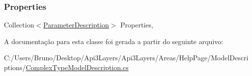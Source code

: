\subsubsection{\texorpdfstring{Properties}{Properties}}
{\footnotesize\ttfamily Collection$<$\hyperlink{classApi3Layers_1_1Areas_1_1HelpPage_1_1ModelDescriptions_1_1ParameterDescription}{Parameter\+Description}$>$ Properties\hspace{0.3cm}{\ttfamily [get]}, {}}



A documentação para esta classe foi gerada a partir do seguinte arquivo\+:\begin{DoxyCompactItemize}
\item 
C\+:/\+Users/\+Bruno/\+Desktop/\+Api3\+Layers/\+Api3\+Layers/\+Areas/\+Help\+Page/\+Model\+Descriptions/\hyperlink{ComplexTypeModelDescription_8cs}{Complex\+Type\+Model\+Description.\+cs}\end{DoxyCompactItemize}
